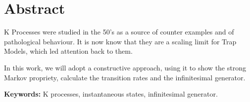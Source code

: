 \chapter*{Abstract}

K Processes were studied in the 50's as a source of counter examples
and of pathological behaviour. It is now know that they are a scaling
limit for Trap Models, which led attention back to them.

In this work, we will adopt a constructive approach, using it to show
the strong Markov propriety, calculate the transition rates and
the infinitesimal generator.

\noindent \textbf{Keywords:} K processes, instantaneous states,
infinitesimal generator.


